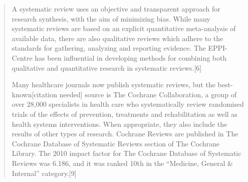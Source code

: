 \begin{quote}
A systematic review uses an objective and transparent approach for
research synthesis, with the aim of minimizing bias. While many
systematic reviews are based on an explicit quantitative meta-analysis
of available data, there are also qualitative reviews which adhere to
the standards for gathering, analyzing and reporting evidence. The
EPPI-Centre has been influential in developing methods for combining
both qualitative and quantitative research in systematic reviews.[6]

Many healthcare journals now publish systematic reviews, but the
best-known[citation needed] source is The Cochrane Collaboration, a
group of over 28,000 specialists in health care who systematically
review randomised trials of the effects of prevention, treatments and
rehabilitation as well as health systems interventions. When
appropriate, they also include the results of other types of
research. Cochrane Reviews are published in The Cochrane Database of
Systematic Reviews section of The Cochrane Library. The 2010 impact
factor for The Cochrane Database of Systematic Reviews was 6.186, and
it was ranked 10th in the ``Medicine, General \& Internal'' category.[9]


\end{quote}

